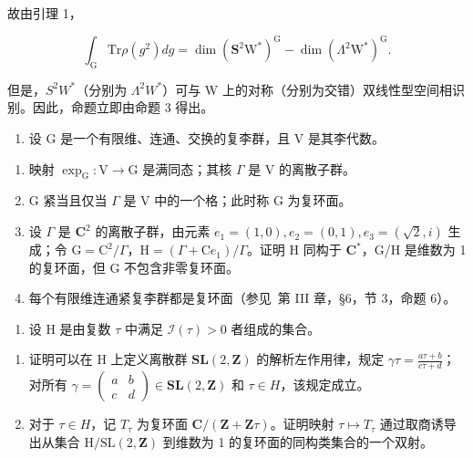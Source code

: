 故由引理 1，

\[
\int_ {\mathrm{G}} \mathrm{Tr} \rho (g ^ {2}) d g = \dim (\mathbf {S} ^ {2} \mathrm{W} ^ {*}) ^ {\mathrm{G}} - \dim (\Lambda^ {2} \mathrm{W} ^ {*}) ^ {\mathrm{G}}.
\]

但是，\(S^{2}W^{*}\)（分别为 \(\Lambda^{2}W^{*}\)）可与 W 上的对称（分别为交错）双线性型空间相识别。因此，命题立即由命题 3 得出。



\begin{enumerate}
\def\labelenumi{\arabic{enumi})}
\tightlist
\item
  设 \(\mathrm{G}\) 是一个有限维、连通、交换的复李群，且 \(\mathrm{V}\) 是其李代数。
\end{enumerate}

\begin{enumerate}
\def\labelenumi{\alph{enumi})}
\item
  映射 \(\exp_{\mathrm{G}}: \mathrm{V} \to \mathrm{G}\) 是满同态；其核 \(\Gamma\) 是 \(\mathrm{V}\) 的离散子群。
\item
  G 紧当且仅当 \(\Gamma\) 是 V 中的一个格；此时称 G 为复环面。
\item
  设 \(\Gamma\) 是 \(\mathbf{C}^2\) 的离散子群，由元素 \(e_1 = (1,0), e_2 = (0,1), e_3 = (\sqrt{2},i)\) 生成；令 \(\mathrm{G} = \mathrm{C}^2 / \Gamma\)，\(\mathrm{H} = (\Gamma + \mathrm{C}e_1) / \Gamma\)。证明 H 同构于 \(\mathbf{C}^*\)，G/H 是维数为 1 的复环面，但 G 不包含非零复环面。
\item
  每个有限维连通紧复李群都是复环面（参见~第 III 章，§6，节 3，命题 6）。
\end{enumerate}

\begin{enumerate}
\def\labelenumi{\arabic{enumi})}
\setcounter{enumi}{1}
\tightlist
\item
  设 H 是由复数 \(\tau\) 中满足 \(\mathcal{I}(\tau) > 0\) 者组成的集合。
\end{enumerate}

\begin{enumerate}
\def\labelenumi{\alph{enumi})}
\item
  证明可以在 H 上定义离散群 \(\mathbf{SL}(2,\mathbf{Z})\) 的解析左作用律，规定 \(\gamma\tau=\frac{a\tau+b}{c\tau+d}\)；对所有 \(\gamma=\begin{pmatrix}a&b\\ c&d\end{pmatrix}\in\mathbf{SL}(2,\mathbf{Z})\) 和 \(\tau\in H\)，该规定成立。
\item
  对于 \(\tau\in H\)，记 \(T_{\tau}\) 为复环面 \(\mathbf{C}/(\mathbf{Z}+\mathbf{Z}\tau)\)。证明映射 \(\tau\mapsto T_{\tau}\) 通过取商诱导出从集合 \(\mathrm{H}/\mathrm{SL}(2,\mathbf{Z})\) 到维数为 1 的复环面的同构类集合的一个双射。
\end{enumerate}

